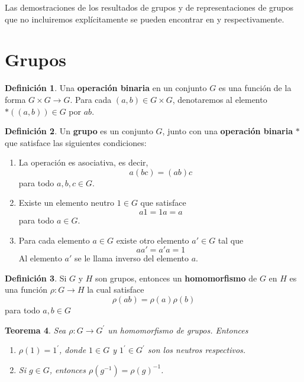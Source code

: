 \documentclass[12pt]{book}
\newtheorem{theorem}{Teorema}[section]
\theoremstyle{definition}
\newtheorem{definition}[theorem]{Definición}
\newcounter{in}
\newcounter{ini}
\begin{document}
Las demostraciones de los resultados de grupos y de representaciones
de grupos que no incluiremos explícitamente se pueden encontrar en
\cite{fraleigh} y \cite{james2001representations} respectivamente.

\section{Grupos}
\label{grupos}

\begin{definition}
  Una \textbf{operación binaria} en un conjunto $G$ es una función
  de la forma $G  \times G \rightarrow G$. Para cada $(a,b)\in G
  \times G$, denotaremos al elemento $*((a,b))\in G$ por $ab$. 
\end{definition} 

\begin{definition} 
  Un \textbf{grupo} es un conjunto $G$, junto con una
  \textbf{operación binaria} $*$ que satisface las siguientes condiciones:
    \begin{enumerate}
    \item La operación es asociativa, es decir, $$a(bc)=(ab)c$$ para todo $a,b,c \in G$.
    \item Existe un elemento neutro $1 \in G$ que
      satisface $$a1=1a=a$$ para todo $a \in G$.
    \item Para cada elemento $a \in G$ existe otro elemento $a' \in G$
      tal que $$aa'=a'a=1$$ Al elemento $a'$ se le llama inverso del elemento $a$.
    \end{enumerate}
\end{definition}

\begin{definition}
  Si $G$ y $H$ son grupos, entonces un \textbf{homomorfismo} de $G$
  en $H$ es una función $\rho:G\rightarrow H$ la cual
  satisface $$\rho(ab)=\rho(a)\rho(b)$$ para todo $a,b \in G$
\end{definition}

\begin{theorem}
  Sea $\rho:G\rightarrow G^{'}$ un homomorfismo de grupos. Entonces
  \begin{enumerate}
    \item $\rho(1)=1^{'}$, donde $1\in G$ y  $1^{'}\in G^{'}$ son los
    neutros respectivos. 
    \item Si $g\in G$, entonces $\rho(g^{-1})=\rho (g)^{-1}$.
  \end{enumerate}
\end{theorem}
\end{document}
